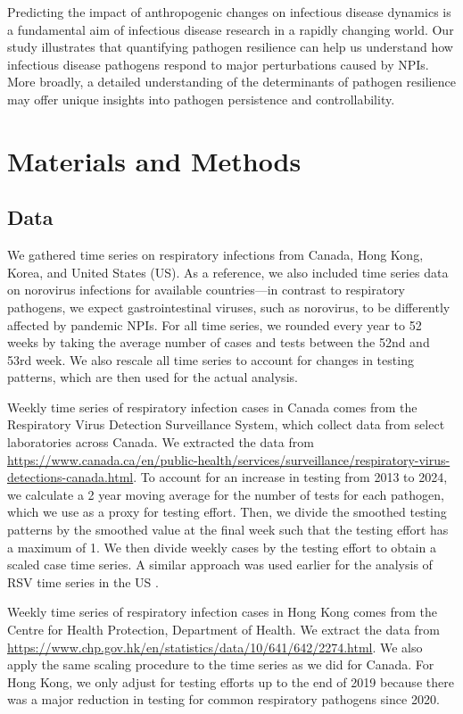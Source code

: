 \documentclass[12pt]{article}
\begin{document}
Predicting the impact of anthropogenic changes on infectious disease dynamics is a fundamental aim of infectious disease research in a rapidly changing world.
Our study illustrates that quantifying pathogen resilience can help us understand how infectious disease pathogens respond to major perturbations caused by NPIs.
More broadly, a detailed understanding of the determinants of pathogen resilience may offer unique insights into pathogen persistence and controllability.

\section*{Materials and Methods}

\subsection*{Data}

We gathered time series on respiratory infections from Canada, Hong Kong, Korea, and United States (US).
As a reference, we also included time series data on norovirus infections for available countries---in contrast to respiratory pathogens, we expect gastrointestinal viruses, such as norovirus, to be differently affected by pandemic NPIs.
For all time series, we rounded every year to 52 weeks by taking the average number of cases and tests between the 52nd and 53rd week.
We also rescale all time series to account for changes in testing patterns, which are then used for the actual analysis.

Weekly time series of respiratory infection cases in Canada comes from the Respiratory Virus Detection Surveillance System, which collect data from select laboratories across Canada.
We extracted the data from \url{https://www.canada.ca/en/public-health/services/surveillance/respiratory-virus-detections-canada.html}.
To account for an increase in testing from 2013 to 2024, we calculate a 2 year moving average for the number of tests for each pathogen, which we use as a proxy for testing effort.
Then, we divide the smoothed testing patterns by the smoothed value at the final week such that the testing effort has a maximum of 1.
We then divide weekly cases by the testing effort to obtain a scaled case time series.
A similar approach was used earlier for the analysis of RSV time series in the US \citep{pitzer2015environmental}.

Weekly time series of respiratory infection cases in Hong Kong comes from the Centre for Health Protection, Department of Health. 
We extract the data from \url{https://www.chp.gov.hk/en/statistics/data/10/641/642/2274.html}.
We also apply the same scaling procedure to the time series as we did for Canada.
For Hong Kong, we only adjust for testing efforts up to the end of 2019 because there was a major reduction in testing for common respiratory pathogens since 2020.
\end{document}
